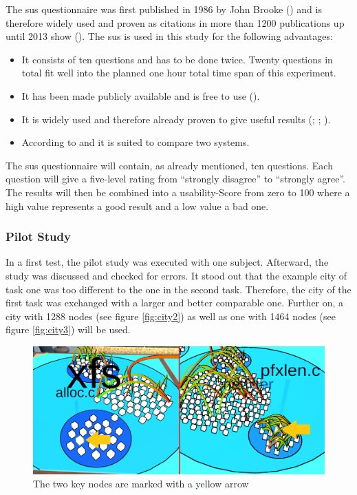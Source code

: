 The \gls{sus} questionnaire was first published in 1986 by John Brooke (\cite{brooke1996sus}) and is therefore widely used and proven as citations in more than 1200 publications up until 2013 show (\cite{brooke2013}).
The \gls{sus} is used in this study for the following advantages: 
\begin{itemize}
  \item It consists of ten questions and has to be done twice. Twenty questions in total fit well into the planned one hour total time span of this experiment.
  \item It has been made publicly available and is free to use (\cite{brooke1996sus}).
  \item It is widely used and therefore already proven to give useful results (\cite{brooke2013}; \cite{lewis2018system}; \cite{grier2013system}).
  \item According to \cite{doi:10.1177/1541931213571043} and \cite{doi:10.1080/10447310802205776} it is suited to compare two systems.
\end{itemize}
The \gls{sus} questionnaire will contain, as already mentioned, ten questions.
Each question will give a five-level rating from \enquote{strongly disagree} to \enquote{strongly agree}.
The results will then be combined into a \gls{usability}-Score from zero to 100 where a high value represents a good result and a low value a bad one.
\subsubsection{Pilot Study}
\label{pilot}
In a first test, the pilot study was executed with one subject.
Afterward, the study was discussed and checked for errors.
It stood out that the example \gls{city} of task one was too different to the one in the second task.
Therefore, the \gls{city} of the first task was exchanged with a larger and better comparable one.
Further on, a \gls{city} with 1288 nodes (see figure \ref{fig:city2}) as well as one with 1464 nodes (see figure \ref{fig:city3}) will be used.

\begin{figure}[htb]
  \centering
  \includegraphics[width=1\textwidth]{Evaluation/img/task1.png}
  \caption{The two key nodes are marked with a yellow arrow}\label{fig:task1}
\end{figure}

